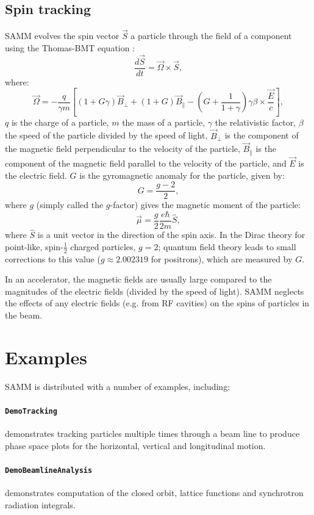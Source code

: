 \documentclass[11pt,twoside,a4paper]{article}
\begin{document}
\subsection{Spin tracking\label{sec:spintracking}}
SAMM evolves the spin vector $\vec{S}$ a particle through the field of a component
using the Thomas-BMT equation \cite{cite:koutchouk}:
\[
\frac{d\vec{S}}{dt} = \vec{\Omega} \times \vec{S},
\]
where:
\[
\vec{\Omega} = -\frac{q}{\gamma m} \left[
( 1 + G\gamma)\vec{B}_\perp + (1 + G)\vec{B}_\parallel -
\left( G + \frac{1}{1+ \gamma} \right) \gamma \beta \times
\frac{\vec{E}}{c}
\right] ,
\]
$q$ is the charge of a particle, $m$ the mass of a particle, $\gamma$
the relativistic factor, $\beta$ the speed of the particle divided by
the speed of light, $\vec{B}_\perp$ is the component of the magnetic field
perpendicular to the velocity of the particle, $\vec{B}_\parallel$ is the
component of the magnetic field parallel to the velocity of the particle,
and $\vec{E}$ is the electric field.  $G$ is the gyromagnetic anomaly for the
particle, given by:
\[
G = \frac{g-2}{2},
\]
where $g$ (simply called the $g$-factor) gives the magnetic moment of the particle:
\[
\vec{\mu} = \frac{g}{2} \frac{e\hbar}{2m} \hat{S},
\] 
where $\hat{S}$ is a unit vector in the direction of the spin axis.  In the
Dirac theory for point-like, spin-$\frac{1}{2}$ charged particles, $g = 2$;
quantum field theory leads to small corrections to this value
($g \approx 2.002319$ for positrons), which are measured by $G$.

In an accelerator, the magnetic fields are usually large compared to the
magnitudes of the electric fields (divided by the speed of light).  SAMM
neglects the effects of any electric fields (e.g. from RF cavities) on the
spins of particles in the beam.

\section{Examples}
SAMM is distributed with a number of examples, including:

\paragraph{\texttt{DemoTracking}} demonstrates tracking particles multiple times
through a beam line to produce phase space plots for the horizontal,
vertical and longitudinal motion.

\paragraph{\texttt{DemoBeamlineAnalysis}} demonstrates computation of the closed
orbit, lattice functions and synchrotron radiation integrals.
\end{document}
